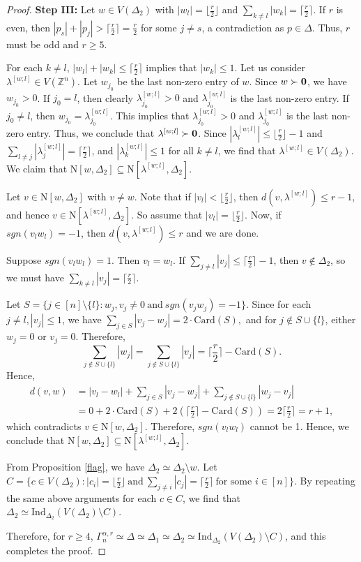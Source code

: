 \documentclass{amsart}
\theoremstyle{definition}
\theoremstyle{remark}
\numberwithin{equation}{section}
\newcommand{\D}{\Delta}
\newcommand{\f}{\lfloor\frac{r}{2}\rfloor}
\newcommand{\cil}{\lceil\frac{r}{2}\rceil}
\def\Z{{\mathbb{Z}}}
\def\n{{\mathrm{N}}}
\begin{document}
\begin{proof}
	
    \smallskip
	\noindent 
	\textbf{Step III:}
	Let $w \in V(\D_2)$ with $|w_l| = \f$ and $\sum_{k \neq l} |w_k| = \cil$.  If $r$ is even, then $|p_s| + |p_j| >  \cil = \frac{r}{2}$ for some $j \neq s$,  a contradiction as $p \in \Delta$. Thus, $r$ must be odd and $r\geq 5$.
	
	For each $k \neq l$, $|w_l|+ |w_k| \leq \cil$ implies that $|w_k| \leq 1$.  Let us consider $\lambda^{[w;l]}\in V(\Z^n)$. Let $w_{j_0}$ be the last non-zero entry of $w$. Since $w\succ {\bf{0}}$, we have $w_{j_0}>0$. If $j_0=l$, then clearly $\lambda^{[w;l]}_{j_0}>0$ and $\lambda^{[w;l]}_{j_0}$ is the last non-zero entry. If ${j_0}\neq l$, then 
	$w_{j_0}=\lambda^{[w;l]}_{j_0}$. This implies that $\lambda^{[w;l]}_{j_0}>0$ and $\lambda^{[w;l]}_{j_0}$ is the last non-zero entry.  Thus, we conclude that $\lambda^{[w;l]}\succ {\bf{0}}$. Since $|\lambda^{[w;l]}_l|\leq \f-1$ and $\sum_{ l\neq j} |\lambda^{[w;l]}_j|=\cil$, and $|\lambda^{[w;l]}_k|\leq 1$ for all $k\neq l$, we find that $\lambda^{[w;l]}\in V(\D_2)$. We claim that $\n[w, \D_2] \subseteq \n[\lambda^{[w;l]}, \D_2]$.
	
	Let $v\in \n[w, \D_2]$ with $v \neq w$. Note that if $|v_l| < \f$, then $d(v, \lambda^{[w;l]}) \leq r - 1$, and hence $v\in \n[\lambda^{[w;l]}, \D_2]$. So assume that $|v_l| = \f$.  Now, if $sgn(v_l w_l) = -1$, then $d(v, \lambda^{[w;l]}) \leq r$ and we are done. 
	
	Suppose $sgn(v_l w_l) = 1$. Then $v_l = w_l$. If $\sum_{j \neq l} |v_j| \leq \cil-1$,  then $v \notin \D_2$, so we must have $\sum_{k \neq l} |v_j| = \cil$. 
	

	
	
	Let $S = \{j \in [n] \setminus \{l\} : w_j, v_j \neq 0 \ \text{and} \ sgn(v_j w_j) = -1  \}$. Since for each $j \neq l , |v_j| \leq 1$, we have 
	$
	\sum_{j \in S} |v_j - w_j| = 2 \cdot \mathrm{Card}(S),
	$
	and for $j \notin S \cup \{l\}$, either $w_j = 0$ or $v_j = 0$. Therefore,
	$$
	\sum_{j \notin S \cup \{l\}} |w_j| = \sum_{j \notin S \cup \{l\}} |v_j| = \cil - \mathrm{Card}(S).
	$$
	Hence,
	$$
	\begin{aligned}
		d(v, w) &= |v_l - w_l| + \sum_{j \in S} |v_j - w_j| + \sum_{j \notin S \cup \{l\}} |w_j - v_j| \\
		&= 0 + 2\cdot \mathrm{Card}(S) + 2(\cil - \mathrm{Card}(S)) = 2\cil = r + 1,
	\end{aligned}
	$$
	which contradicts $v \in \n[w,\D_2]$. Therefore, $sgn(v_l w_l)$ cannot be 1. Hence, we conclude that $\n[w, \D_2] \subseteq \n[\lambda^{[w;l]}, \D_2]$.
	
	From Proposition \ref{flag}, we have $\D_2 \simeq \D_2 \setminus w.$ Let $C=\{c\in V(\D_2): |c_i|=\f\ \text{and}\ \sum_{j\neq i}|c_j|=\cil\ \text{for some } i\in [n]\}$. By repeating the same above arguments for each $c\in C$, we find that  $\D_2 \simeq \mathrm{Ind}_{\D_2}(V(\D_2) \setminus C).$ 
	
	Therefore, for $r\geq 4$, $\Gamma_n^{\alpha,r}\simeq \D \simeq \D_1 \simeq \D_2\simeq \mathrm{Ind}_{\D_2}(V(\D_2) \setminus C)$, and this completes the proof.
\end{proof}
\end{document}
